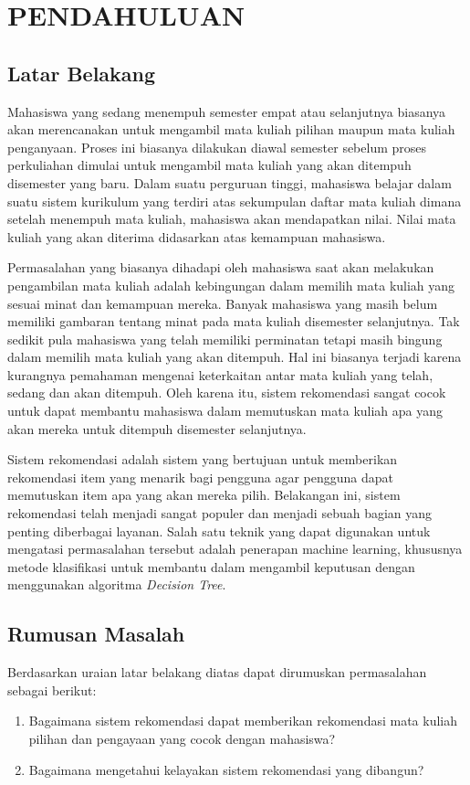 \section{PENDAHULUAN}

\subsection{Latar Belakang}

Mahasiswa yang sedang menempuh semester empat atau selanjutnya biasanya akan merencanakan untuk mengambil
mata kuliah pilihan maupun mata kuliah penganyaan. Proses ini biasanya dilakukan diawal semester sebelum proses perkuliahan
dimulai untuk mengambil mata kuliah yang akan ditempuh disemester yang baru. Dalam suatu perguruan tinggi, mahasiswa belajar dalam suatu
sistem kurikulum yang terdiri atas sekumpulan daftar mata kuliah dimana setelah menempuh mata kuliah,
mahasiswa akan mendapatkan nilai. Nilai mata kuliah yang akan diterima didasarkan atas kemampuan
mahasiswa.

Permasalahan yang biasanya dihadapi oleh mahasiswa saat akan melakukan pengambilan mata kuliah adalah kebingungan dalam
memilih mata kuliah yang sesuai minat dan kemampuan mereka. Banyak mahasiswa yang masih belum memiliki gambaran tentang
minat pada mata kuliah disemester selanjutnya. Tak sedikit pula mahasiswa yang telah memiliki perminatan tetapi masih
bingung dalam memilih mata kuliah yang akan ditempuh. Hal ini biasanya terjadi karena kurangnya pemahaman mengenai
keterkaitan antar mata kuliah yang telah, sedang dan akan ditempuh. Oleh karena itu, sistem rekomendasi sangat cocok untuk
dapat membantu mahasiswa dalam memutuskan mata kuliah apa yang akan mereka untuk ditempuh disemester selanjutnya.

Sistem rekomendasi adalah sistem yang bertujuan untuk memberikan rekomendasi item yang menarik bagi pengguna agar pengguna
dapat memutuskan item apa yang akan mereka pilih. Belakangan ini, sistem rekomendasi telah menjadi sangat populer dan menjadi
sebuah bagian yang penting diberbagai layanan. Salah satu teknik yang dapat digunakan untuk mengatasi permasalahan tersebut adalah
penerapan machine learning, khususnya metode klasifikasi untuk membantu dalam mengambil keputusan dengan menggunakan algoritma
\emph{Decision Tree}.

\subsection{Rumusan Masalah}
Berdasarkan uraian latar belakang diatas dapat dirumuskan permasalahan sebagai berikut:
\begin{enumerate}[noitemsep]
      \item Bagaimana sistem rekomendasi dapat memberikan rekomendasi mata kuliah pilihan dan pengayaan
            yang cocok dengan mahasiswa?
      \item Bagaimana mengetahui kelayakan sistem rekomendasi yang dibangun?
\end{enumerate}

